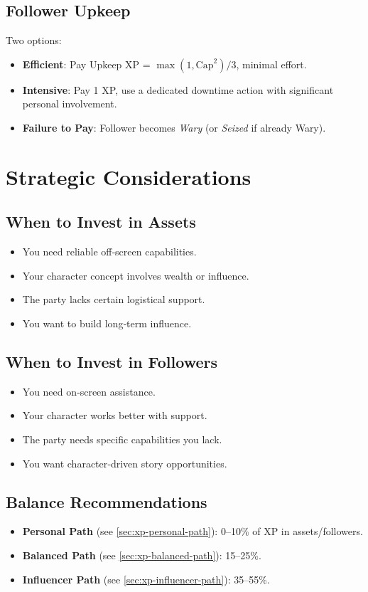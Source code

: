 \subsection*{Follower Upkeep}
\label{sec:follower-upkeep}
Two options:
\begin{itemize}
\item \textbf{Efficient}:  
  Pay Upkeep XP = $\max(1, \text{Cap}^2) / 3$, minimal effort.
\item \textbf{Intensive}:  
  Pay 1 XP, use a dedicated downtime action with significant personal involvement.
\item \textbf{Failure to Pay}: Follower becomes \emph{Wary} (or \emph{Seized} if already Wary).
\end{itemize}

\section{Strategic Considerations}
\label{sec:asset-follower-strategy}

\subsection*{When to Invest in Assets}
\label{sec:invest-assets}
\begin{itemize}
\item You need reliable off‑screen capabilities.
\item Your character concept involves wealth or influence.
\item The party lacks certain logistical support.
\item You want to build long‑term influence.
\end{itemize}

\subsection*{When to Invest in Followers}
\label{sec:invest-followers}
\begin{itemize}
\item You need on‑screen assistance.
\item Your character works better with support.
\item The party needs specific capabilities you lack.
\item You want character‑driven story opportunities.
\end{itemize}

\subsection*{Balance Recommendations}
\label{sec:asset-follower-balance}
\begin{itemize}
\item \textbf{Personal Path} (see \ref{sec:xp-personal-path}): 0–10\% of XP in assets/followers.
\item \textbf{Balanced Path} (see \ref{sec:xp-balanced-path}): 15–25\%.
\item \textbf{Influencer Path} (see \ref{sec:xp-influencer-path}): 35–55\%.
\end{itemize}

